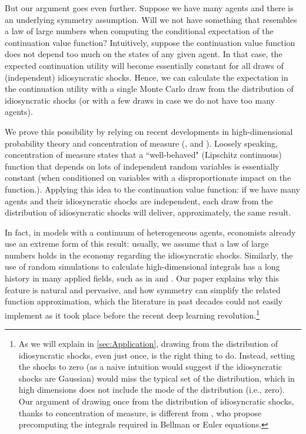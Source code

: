 \documentclass[12pt]{article}
\begin{document}
But our argument goes even further. Suppose we have many agents and there is an underlying symmetry assumption. Will we not have something that resembles a law of large numbers when computing the conditional expectation of the continuation value function? Intuitively, suppose the continuation value function does not depend too much on the states of any given agent. In that case, the expected continuation utility will become essentially constant for all draws of (independent) idiosyncratic shocks. Hence, we can calculate the expectation in the continuation utility with a single Monte Carlo draw from the distribution of idiosyncratic shocks (or with a few draws in case we do not have too many agents). 

We prove this possibility by relying on recent developments in high-dimensional probability theory and concentration of measure (\citealp{barvinok2005math}, and \citealp{vershynin2018high}). Loosely speaking, concentration of measure states that a ``well-behaved" (Lipschitz continuous) function that depends on lots of independent random variables is essentially constant (when conditioned on variables with a disproportionate impact on the function.). Applying this idea to the continuation value function: if we have many agents and their idiosyncratic shocks are independent, each draw from the distribution of idiosyncratic shocks will deliver, approximately, the same result. 

In fact, in models with a continuum of heterogeneous agents, economists already use an extreme form of this result: usually, we assume that a law of large numbers holds in the economy regarding the idiosyncratic shocks. Similarly, the use of random simulations to calculate high-dimensional integrals has a long history in many applied fields, such as in \citet{Rust1997} and \citet{Keane1994}. Our paper explains why this feature is natural and pervasive, and how symmetry can simplify the related function approximation, which the literature in past decades could not easily implement as it took place before the recent deep learning revolution.\footnote{As we will explain in \cref{sec:Application}, drawing from the distribution of idiosyncratic shocks, even just once, is the right thing to do. Instead, setting the shocks to zero (as a naive intuition would suggest if the idiosyncratic shocks are Gaussian) would miss the typical set of the distribution, which in high dimensions does not include the mode of the distribution (i.e., zero). Our argument of drawing once from the distribution of idiosyncratic shocks, thanks to concentration of measure, is different from \citet{Judd2017}, who propose precomputing the integrals required in Bellman or Euler equations.}
\end{document}
